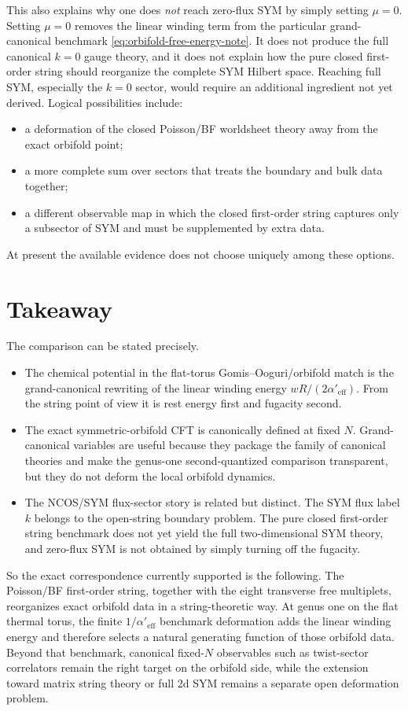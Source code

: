 \documentclass[11pt]{article}
\newcommand{\Aeff}{\alpha'_{\mathrm{eff}}}
\begin{document}
This also explains why one does \emph{not} reach zero-flux SYM by simply setting $\mu=0$. Setting $\mu=0$ removes the linear winding term from the particular grand-canonical benchmark \eqref{eq:orbifold-free-energy-note}. It does not produce the full canonical $k=0$ gauge theory, and it does not explain how the pure closed first-order string should reorganize the complete SYM Hilbert space. Reaching full SYM, especially the $k=0$ sector, would require an additional ingredient not yet derived. Logical possibilities include:
\begin{itemize}
\item a deformation of the closed Poisson/BF worldsheet theory away from the exact orbifold point;
\item a more complete sum over sectors that treats the boundary and bulk data together;
\item a different observable map in which the closed first-order string captures only a subsector of SYM and must be supplemented by extra data.
\end{itemize}
At present the available evidence does not choose uniquely among these options.

\section{Takeaway}
The comparison can be stated precisely.
\begin{itemize}
\item The chemical potential in the flat-torus Gomis--Ooguri/orbifold match is the grand-canonical rewriting of the linear winding energy $wR/(2\Aeff)$. From the string point of view it is rest energy first and fugacity second.
\item The exact symmetric-orbifold CFT is canonically defined at fixed $N$. Grand-canonical variables are useful because they package the family of canonical theories and make the genus-one second-quantized comparison transparent, but they do not deform the local orbifold dynamics.
\item The NCOS/SYM flux-sector story is related but distinct. The SYM flux label $k$ belongs to the open-string boundary problem. The pure closed first-order string benchmark does not yet yield the full two-dimensional SYM theory, and zero-flux SYM is not obtained by simply turning off the fugacity.
\end{itemize}

So the exact correspondence currently supported is the following. The Poisson/BF first-order string, together with the eight transverse free multiplets, reorganizes exact orbifold data in a string-theoretic way. At genus one on the flat thermal torus, the finite $1/\Aeff$ benchmark deformation adds the linear winding energy and therefore selects a natural generating function of those orbifold data. Beyond that benchmark, canonical fixed-$N$ observables such as twist-sector correlators remain the right target on the orbifold side, while the extension toward matrix string theory or full 2d SYM remains a separate open deformation problem.

\printbibliography
\end{document}
